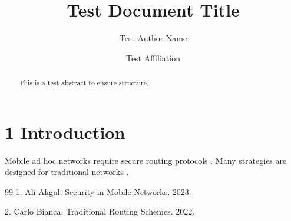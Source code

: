 \documentclass{default}
\begin{document}
\journalheader

\title{Test Document Title}
\author{Test Author Name \and Test Affiliation}
\date{}
\maketitle

\begin{abstract}
This is a test abstract to ensure structure.
\end{abstract}

\section{1 Introduction}

Mobile ad hoc networks require secure routing protocols \cite{ref1}. Many strategies are designed for traditional networks \cite{ref2}.

\begin{thebibliography}{99}
1. Ali Akgul. Security in Mobile Networks. 2023.

2. Carlo Bianca. Traditional Routing Schemes. 2022.

\end{thebibliography}
\end{document}
